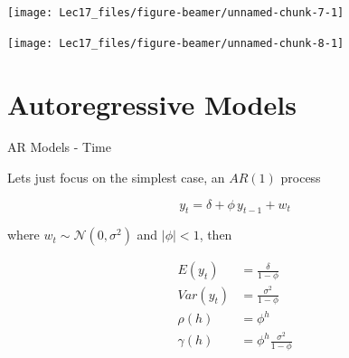\documentclass[11pt,ignorenonframetext,]{beamer}
\begin{document}
\begin{frame}{}
\protect\hypertarget{section}{}

\begin{center}\texttt{[image: Lec17\_files/figure-beamer/unnamed-chunk-7-1]} \end{center}

\end{frame}

\begin{frame}{}
\protect\hypertarget{section-1}{}

\begin{center}\texttt{[image: Lec17\_files/figure-beamer/unnamed-chunk-8-1]} \end{center}

\end{frame}

\hypertarget{autoregressive-models}{%
\section{Autoregressive Models}\label{autoregressive-models}}

\begin{frame}[t]{AR Models - Time}
\protect\hypertarget{ar-models---time}{}

Lets just focus on the simplest case, an \(AR(1)\) process

\[ y_t = \delta + \phi \, y_{t-1} + w_t \]

where \(w_t \sim \mathcal{N}(0,\sigma^2)\) and \(|\phi| < 1\), then

\[
\begin{aligned}
E(y_t) &= \frac{\delta}{1-\phi} \\
Var(y_t) &= \frac{\sigma^2}{1-\phi} \\
\rho(h) &= \phi^{h} \\
\gamma(h) &=  \phi^h \frac{\sigma^2}{1-\phi}
\end{aligned}
\]

\end{frame}
\end{document}
